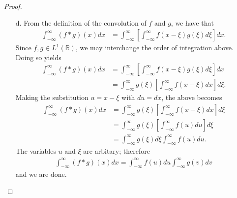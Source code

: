\begin{proof}
\begin{enumerate}
    \item [d.] From the definition of the convolution of $f$ and $g$, we have that
      \begin{align*}
        \int_{-\infty}^{\infty} (f \ast g)(x) dx &= \int_{-\infty}^{\infty} \left[\int_{-\infty}^{\infty} f(x - \xi) g(\xi) d\xi\right] dx.
      \end{align*}
      Since $f, g \in L^1(\mathbb{R})$, we may interchange the order of integration above. Doing so yields
      \begin{align*}
        \int_{-\infty}^{\infty} (f \ast g)(x) dx
        &= \int_{-\infty}^{\infty} \left[\int_{-\infty}^{\infty} f(x - \xi) g(\xi) d\xi\right] dx\\
        &= \int_{-\infty}^{\infty} g(\xi)\left[\int_{-\infty}^{\infty} f(x - \xi) dx\right] d\xi.
      \end{align*}
      Making the substitution $u= x- \xi$ with $du = dx$, the above becomes
      \begin{align*}
        \int_{-\infty}^{\infty} (f \ast g)(x) dx &= \int_{-\infty}^{\infty} g(\xi)\left[\int_{-\infty}^{\infty} f(x - \xi) dx\right] d\xi\\
        &= \int_{-\infty}^{\infty} g(\xi)\left[\int_{-\infty}^{\infty} f(u) du\right] d\xi \\
        &= \int_{-\infty}^{\infty} g(\xi) d\xi \int_{-\infty}^{\infty} f(u) du.
      \end{align*}
      The variables $u$ and $\xi$ are arbitary; therefore
      \begin{align*}
        \int_{-\infty}^{\infty} (f \ast g)(x) dx = \int_{-\infty}^{\infty} f(u)du \int_{-\infty}^{\infty} g(v)dv
      \end{align*}
      and we are done.
  \end{enumerate}
\end{proof}
\newpage
